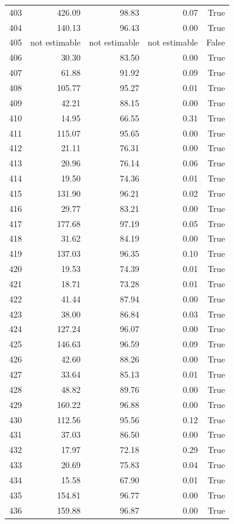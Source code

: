 \begin{longtable}{rrrrr}
403 & 426.09 & 98.83 & 0.07 & True \\
404 & 140.13 & 96.43 & 0.00 & True \\
405 & not estimable & not estimable & not estimable & False \\
406 & 30.30 & 83.50 & 0.00 & True \\
407 & 61.88 & 91.92 & 0.09 & True \\
408 & 105.77 & 95.27 & 0.01 & True \\
409 & 42.21 & 88.15 & 0.00 & True \\
410 & 14.95 & 66.55 & 0.31 & True \\
411 & 115.07 & 95.65 & 0.00 & True \\
412 & 21.11 & 76.31 & 0.00 & True \\
413 & 20.96 & 76.14 & 0.06 & True \\
414 & 19.50 & 74.36 & 0.01 & True \\
415 & 131.90 & 96.21 & 0.02 & True \\
416 & 29.77 & 83.21 & 0.00 & True \\
417 & 177.68 & 97.19 & 0.05 & True \\
418 & 31.62 & 84.19 & 0.00 & True \\
419 & 137.03 & 96.35 & 0.10 & True \\
420 & 19.53 & 74.39 & 0.01 & True \\
421 & 18.71 & 73.28 & 0.01 & True \\
422 & 41.44 & 87.94 & 0.00 & True \\
423 & 38.00 & 86.84 & 0.03 & True \\
424 & 127.24 & 96.07 & 0.00 & True \\
425 & 146.63 & 96.59 & 0.09 & True \\
426 & 42.60 & 88.26 & 0.00 & True \\
427 & 33.64 & 85.13 & 0.01 & True \\
428 & 48.82 & 89.76 & 0.00 & True \\
429 & 160.22 & 96.88 & 0.00 & True \\
430 & 112.56 & 95.56 & 0.12 & True \\
431 & 37.03 & 86.50 & 0.00 & True \\
432 & 17.97 & 72.18 & 0.29 & True \\
433 & 20.69 & 75.83 & 0.04 & True \\
434 & 15.58 & 67.90 & 0.01 & True \\
435 & 154.81 & 96.77 & 0.00 & True \\
436 & 159.88 & 96.87 & 0.00 & True \\

\end{longtable}
